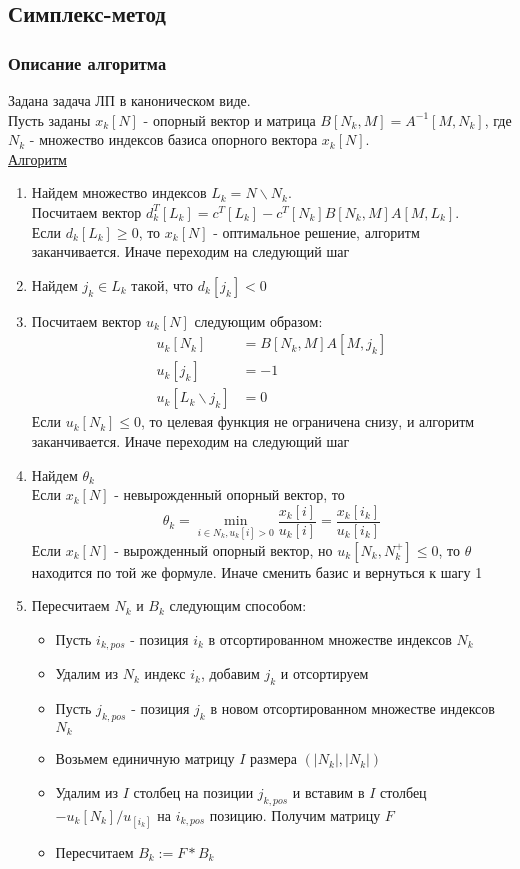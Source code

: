 \subsection{Симплекс-метод}
\subsubsection{Описание алгоритма}
Задана задача ЛП в каноническом виде.\\
Пусть заданы $x_k[N]$ - опорный вектор и матрица $B[N_k, M]=A^{-1}[M,N_k]$, где $N_k$ - множество индексов базиса опорного вектора $x_k[N]$.\\
\underline{Алгоритм}
\begin{enumerate}
	\item Найдем множество индексов $L_k=N \backslash N_k$.\\
	Посчитаем вектор $d_k^T[L_k]=c^T[L_k]-c^T[N_k]B[N_k,M]A[M,L_k]$.\\
	Если $d_k[L_k]\geq0$, то $x_k[N]$ - оптимальное решение, алгоритм заканчивается. Иначе переходим на следующий шаг
	
	\item Найдем $j_k\in L_k$ такой, что $d_k[j_k]<0$
	
	\item Посчитаем вектор $u_k[N]$ следующим образом:
	\begin{align*} 
	u_k[N_k]&=B[N_k,M]A[M,j_k] \\
	u_k[j_k]&=-1 \\
	u_k[L_k\backslash j_k]&=0
	\end{align*}
	Если $u_k[N_k]\leq0$, то целевая функция не ограничена снизу, и алгоритм заканчивается. Иначе переходим на следующий шаг
	
	\item Найдем $\theta_k$\\
	Если $x_k[N]$ - невырожденный опорный вектор, то\\
	\begin{equation*}
	\theta_k=\min_{i\in N_k, u_k[i]>0}\frac{x_k[i]}{u_k[i]}=\frac{x_k[i_k]}{u_k[i_k]}
	\end{equation*}
	Если $x_k[N]$ - вырожденный опорный вектор, но $u_k[N_k,N_k^{+}]\leq0$, то $\theta$ находится по той же формуле. Иначе сменить базис и вернуться к шагу 1
	
	\item Пересчитаем $N_k$ и $B_k$ следующим способом:
	\begin{itemize}
	\item Пусть $i_{k,pos}$ - позиция $i_k$ в отсортированном множестве индексов $N_k$
	\item Удалим из $N_k$ индекс $i_k$, добавим $j_k$ и отсортируем
	\item Пусть $j_{k,pos}$ - позиция $j_k$ в новом отсортированном множестве индексов $N_k$
	\item Возьмем единичную матрицу $I$ размера $(|N_k|,|N_k|)$
	\item Удалим из $I$ столбец на позиции $j_{k,pos}$ и вставим в $I$ столбец $-u_k[N_k]/u_[i_k]$ на $i_{k,pos}$ позицию. Получим матрицу $F$
	\item Пересчитаем $B_k:=F\ast B_k$
	\end{itemize}
	

\end{enumerate}

